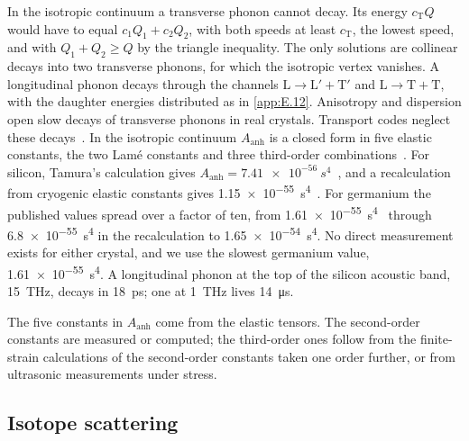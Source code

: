 In the isotropic continuum a transverse phonon cannot decay. Its energy $c_{\mathrm{T}}Q$ would have to equal $c_1Q_1 + c_2Q_2$, with both speeds at least $c_{\mathrm{T}}$, the lowest speed, and with $Q_1 + Q_2 \ge Q$ by the triangle inequality. The only solutions are collinear decays into two transverse phonons, for which the isotropic vertex vanishes. A longitudinal phonon decays through the channels $\mathrm{L}\to\mathrm{L}'+\mathrm{T}'$ and $\mathrm{L}\to\mathrm{T}+\mathrm{T}$, with the daughter energies distributed as in \cref{app:E.12}. Anisotropy and dispersion open slow decays of transverse phonons in real crystals. Transport codes neglect these decays~\cite[Sect.~2.2.2]{kelsey2023g4cmp}. In the isotropic continuum $A_{\mathrm{anh}}$ is a closed form in five elastic constants, the two Lamé constants and three third-order combinations~\cite[Eqs.~(1), (2)]{hernandez2025modeling}. For silicon, Tamura's calculation gives $A_{\mathrm{anh}} = \SI{7.41e-56}{s^4}$~\cite[Table~I]{leman2012invited}, and a recalculation from cryogenic elastic constants gives \SI{1.15e-55}{s^4}~\cite[Table~3]{hernandez2025modeling}. For germanium the published values spread over a factor of ten, from \SI{1.61e-55}{s^4}~\cite{hertel2012phonon} through \SI{6.8e-55}{s^4} in the recalculation to \SI{1.65e-54}{s^4}. No direct measurement exists for either crystal, and we use the slowest germanium value, \SI{1.61e-55}{s^4}. A longitudinal phonon at the top of the silicon acoustic band, \SI{15}{THz}, decays in \SI{18}{ps}; one at \SI{1}{THz} lives \SI{14}{\micro s}.

The five constants in $A_{\mathrm{anh}}$ come from the elastic tensors. The second-order constants are measured or computed; the third-order ones follow from the finite-strain calculations of the second-order constants taken one order further, or from ultrasonic measurements under stress.

\subsection{Isotope scattering}\label{sec:20.2-iso}


